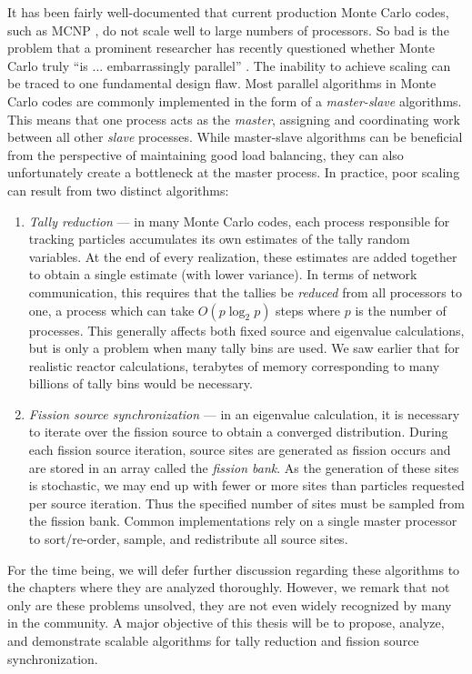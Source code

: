 It has been fairly well-documented that current production Monte Carlo codes,
such as MCNP \cite{nt-goorley-2012}, do not scale well to large numbers of
processors. So bad is the problem that a prominent researcher has recently
questioned whether Monte Carlo truly ``is ... embarrassingly parallel''
\cite{physor-hoogenboom-2012}. The inability to achieve scaling can be traced to
one fundamental design flaw. Most parallel algorithms in Monte Carlo codes are
commonly implemented in the form of a \emph{master-slave} algorithms. This means
that one process acts as the \emph{master}, assigning and coordinating work
between all other \emph{slave} processes. While master-slave algorithms can be
beneficial from the perspective of maintaining good load balancing, they can
also unfortunately create a bottleneck at the master process. In practice, poor
scaling can result from two distinct algorithms:
\begin{enumerate}
\item \emph{Tally reduction} --- in many Monte Carlo codes, each process
  responsible for tracking particles accumulates its own estimates of the tally
  random variables. At the end of every realization, these estimates are added
  together to obtain a single estimate (with lower variance). In terms of
  network communication, this requires that the tallies be \emph{reduced} from
  all processors to one, a process which can take $O(p \log_2 p)$ steps where
  $p$ is the number of processes. This generally affects both fixed source and
  eigenvalue calculations, but is only a problem when many tally bins are
  used. We saw earlier that for realistic reactor calculations, terabytes of
  memory corresponding to many billions of tally bins would be necessary.
\item \emph{Fission source synchronization} --- in an eigenvalue calculation, it
  is necessary to iterate over the fission source to obtain a converged
  distribution. During each fission source iteration, source sites are generated
  as fission occurs and are stored in an array called the \emph{fission
    bank}. As the generation of these sites is stochastic, we may end up with
  fewer or more sites than particles requested per source iteration. Thus the
  specified number of sites must be sampled from the fission bank. Common
  implementations rely on a single master processor to sort/re-order, sample,
  and redistribute all source sites.
\end{enumerate}
For the time being, we will defer further discussion regarding these algorithms
to the chapters where they are analyzed thoroughly. However, we remark that not
only are these problems unsolved, they are not even widely recognized by many in
the community. A major objective of this thesis will be to propose, analyze, and
demonstrate scalable algorithms for tally reduction and fission source
synchronization.

